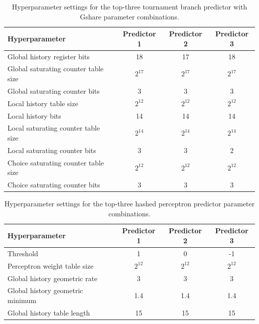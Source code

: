 \documentclass{article}
\begin{document}
\begin{table}[h]
    \centering
    \begin{tabular}{lccc}
        \toprule
        \textbf{Hyperparameter} & \textbf{Predictor 1} & \textbf{Predictor 2} & \textbf{Predictor 3} \\
        \midrule
        Global history register bits       & 18 & 17 & 18 \\
        Global saturating counter table size & $2^{17}$ & $2^{17}$ & $2^{17}$ \\
        Global saturating counter bits     & 3 & 3 & 3 \\
        Local history table size           & $2^{12}$ & $2^{12}$ & $2^{12}$ \\
        Local history bits                 & 14 & 14 & 14 \\
        Local saturating counter table size & $2^{14}$ & $2^{14}$ & $2^{14}$ \\
        Local saturating counter bits      & 3 & 3 & 2 \\
        Choice saturating counter table size & $2^{12}$ & $2^{12}$ & $2^{12}$ \\
        Choice saturating counter bits     & 3 & 3 & 3 \\
        \bottomrule
    \end{tabular}
    \caption{Hyperparameter settings for the top-three tournament branch predictor with Gshare parameter combinations.}
    \label{tab:tbp_gshare_res_desc}
\end{table}

\begin{table}[h]
    \centering
    \begin{tabular}{lccc}
        \toprule
        \textbf{Hyperparameter} & \textbf{Predictor 1} & \textbf{Predictor 2} & \textbf{Predictor 3} \\
        \midrule
        Threshold                        & 1 & 0 & -1 \\
        Perceptron weight table size      & $2^{12}$ & $2^{12}$ & $2^{12}$ \\
        Global history geometric rate     & 3 & 3 & 3 \\
        Global history geometric minimum  & 1.4 & 1.4 & 1.4 \\
        Global history table length       & 15 & 15 & 15 \\
        \bottomrule
    \end{tabular}
    \caption{Hyperparameter settings for the top-three hashed perceptron predictor parameter combinations.}
    \label{tab:hp_res_desc}
\end{table}
\end{document}
